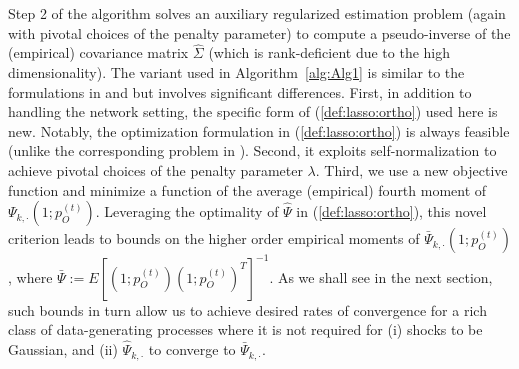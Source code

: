 \documentclass[opre,nonblindrev]{informs3} %
\begin{document}
Step 2 of the algorithm solves an auxiliary regularized estimation problem (again with pivotal choices of the penalty parameter) to compute a pseudo-inverse of the (empirical) covariance matrix $\hat \Sigma$ (which is rank-deficient due to the high dimensionality). The variant used in Algorithm~\ref{alg:Alg1} is similar to the formulations in \cite{javanmard2014confidence} 
and \cite{zhu2016significance}
but involves significant differences.
First, in addition to handling the network setting, the specific form of (\ref{def:lasso:ortho}) used here is new. Notably,
	the optimization formulation  in (\ref{def:lasso:ortho}) is always feasible (unlike the corresponding problem in \cite{javanmard2014confidence}).
 Second, it exploits self-normalization to achieve pivotal choices of the penalty parameter $\lambda$. Third, we use a new objective function and minimize a function of  the average (empirical) fourth moment of $\Psi_{k,\cdot}(1;p_O^{(t)})$.
Leveraging the optimality of 
$\hat\Psi$ in
(\ref{def:lasso:ortho}), this 
novel criterion 
 leads to bounds on the higher order empirical moments of
$\bar\Psi_{k,\cdot}(1;p_O^{(t)})$, where 
$\bar \Psi:=E[(1;p_O^{(t)})(1;p_O^{(t)})^T]^{-1}$.
As we shall see in the next section, such bounds
 in turn allow us to 
 achieve desired rates of convergence
 for a rich class of data-generating processes where 
 it is not required for
 (i)  shocks to be Gaussian, and 
 (ii) $\hat \Psi_{k,\cdot}$ to converge to $\bar \Psi_{k,\cdot}$.
\end{document}
